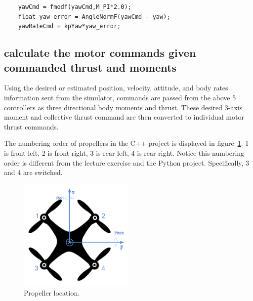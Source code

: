 \documentclass[a4paper]{article}
\begin{document}
\begin{lstlisting}
    yawCmd = fmodf(yawCmd,M_PI*2.0);
    float yaw_error = AngleNormF(yawCmd - yaw);
    yawRateCmd = kpYaw*yaw_error;
\end{lstlisting}

\subsection{calculate the motor commands given commanded thrust and moments}

Using the desired or estimated position, velocity, attitude, and body rates information sent from the simulator, commands are passed from the above 5 controllers as three directional body moments and thrust. These desired 3-axis moment and collective thrust command are then converted to individual motor thrust commands.

The numbering order of propellers in the C++ project is displayed in figure~\ref{fig:drone1}. 1 is front left, 2 is front right, 3 is rear left, 4 is rear right. Notice this numbering order is different from the lecture exercise and the Python project. Specifically, 3 and 4 are switched. 

\begin{figure}[ht]
\centering
\includegraphics[width=0.5\textwidth]{./fig/drone1.png}
\caption{\label{fig:drone1} Propeller location.}
\end{figure}
\end{document}
